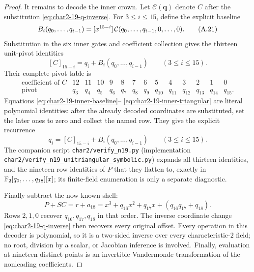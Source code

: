 \begin{proof}
It remains to decode the inner crown.  Let $\mathcal C(\mathbf q)$ denote
$C$ after the substitution \eqref{eq:char2-19-q-inverse}.  For
$3\le i\le15$, define the explicit baseline
\[
 B_i(q_0,\ldots,q_{i-1})
 =\coeff{\mathcal C(q_0,\ldots,q_{i-1},0,\ldots,0)}{15-i}.
                                                                    \tag{A.21}\label{eq:char2-19-inner-baseline}
\]
Substitution in the six inner gates and coefficient collection gives the
thirteen unit-pivot identities
\[
 [C]_{15-i}=q_i+B_i(q_0,\ldots,q_{i-1})\qquad(3\le i\le15).      \tag{A.22}\label{eq:char2-19-inner-triangular}
\]
Their complete pivot table is
\[
\begin{array}{c|rrrrrrrrrrrrr}
\text{coefficient of }C&12&11&10&9&8&7&6&5&4&3&2&1&0\\ \hline
\text{pivot}&q_3&q_4&q_5&q_6&q_7&q_8&q_9&q_{10}&q_{11}&q_{12}&q_{13}&q_{14}&q_{15}.
\end{array}                                                       \tag{A.23}\label{eq:char2-19-inner-table}
\]
Equations \eqref{eq:char2-19-inner-baseline}--
\eqref{eq:char2-19-inner-triangular} are literal polynomial identities:
after the already decoded coordinates are substituted, set the later ones to
zero and collect the named row.  They give the explicit recurrence
\[
 q_i=[C]_{15-i}+B_i(q_0,\ldots,q_{i-1})\qquad(3\le i\le15).      \tag{A.24}\label{eq:char2-19-inner-decoder}
\]
The companion script \texttt{char2/verify\_n19.py} (implementation
\texttt{char2/\allowbreak verify\_\allowbreak n19\_\allowbreak unitriangular\_\allowbreak symbolic.py}) expands all thirteen
identities, and the nineteen row identities of $P$ that they flatten to,
exactly in $\F_2[q_0,\ldots,q_{18}][x]$; its finite-field
enumeration is only a separate diagnostic.

Finally subtract the now-known shell:
\[
 P+SC=r+a_{18}
 =x^3+q_{16}x^2+q_{17}x+(q_{16}q_{17}+q_{18}).                   \tag{A.25}\label{eq:char2-19-low-tail}
\]
Rows $2,1,0$ recover $q_{16},q_{17},q_{18}$ in that order.  The inverse
coordinate change \eqref{eq:char2-19-q-inverse} then recovers every original
offset.  Every operation in this decoder is polynomial, so it is a two-sided
inverse over every characteristic-$2$ field; no root, division by a scalar, or
Jacobian inference is involved.  Finally, evaluation at nineteen distinct
points is an invertible Vandermonde transformation of the nonleading
coefficients.
\end{proof}

